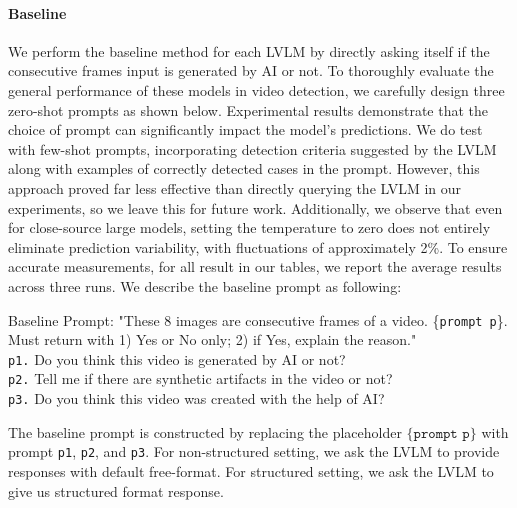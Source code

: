 \paragraph{Baseline}
We perform the baseline method for each LVLM by directly asking itself if the consecutive frames input is generated by AI or not. To thoroughly evaluate the general performance of these models in video detection, we carefully design three zero-shot prompts as shown below. Experimental results demonstrate that the choice of prompt can significantly impact the model's predictions.
We do test with few-shot prompts, incorporating detection criteria suggested by the LVLM along with examples of correctly detected cases in the prompt. However, this approach proved far less effective than directly querying the LVLM in our experiments, so we leave this for future work.
Additionally, we observe that even for close-source large models, setting the temperature to zero does not entirely eliminate prediction variability, with fluctuations of approximately 2\%. To ensure accurate measurements, for all result in our tables, we report the average results across three runs.
We describe the baseline prompt as following:
\begin{tcolorbox}[colback=white!5!white,colframe=gray!2!gray,arc=2mm,fontupper=\small, left=2pt, right=2pt]
\begin{adjustbox}{minipage=[c][0.33\linewidth]{1\linewidth}}
Baseline Prompt: "These 8 images are consecutive frames of a video. \{\texttt{prompt p}\}. Must return with 1) Yes or No only; 2) if Yes, explain the reason."\\

\texttt{p1.} Do you think this video is generated by AI or not? \\
\texttt{p2.} Tell me if there are synthetic artifacts in the video or not? \\
\texttt{p3.} Do you think this video was created with the help of AI?
\end{adjustbox}
\end{tcolorbox}
The baseline prompt is constructed by replacing the placeholder $\{\texttt{prompt p}\}$ with prompt \texttt{p1}, \texttt{p2}, and \texttt{p3}. For non-structured setting, we ask the LVLM to provide responses with default free-format. For structured setting, we ask the LVLM to give us structured format response.



